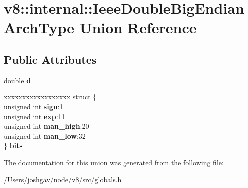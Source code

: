 \hypertarget{unionv8_1_1internal_1_1_ieee_double_big_endian_arch_type}{}\section{v8\+:\+:internal\+:\+:Ieee\+Double\+Big\+Endian\+Arch\+Type Union Reference}
\label{unionv8_1_1internal_1_1_ieee_double_big_endian_arch_type}
\subsection*{Public Attributes}
\begin{DoxyCompactItemize}
\item 
double {\bfseries d}\hypertarget{unionv8_1_1internal_1_1_ieee_double_big_endian_arch_type_a08d5c0c44b46ddb10508790724f0f6a3}{}\label{unionv8_1_1internal_1_1_ieee_double_big_endian_arch_type_a08d5c0c44b46ddb10508790724f0f6a3}

\item 
\begin{tabbing}
xx\=xx\=xx\=xx\=xx\=xx\=xx\=xx\=xx\=\kill
struct \{\\
\>unsigned int {\bfseries sign}:1\\
\>unsigned int {\bfseries exp}:11\\
\>unsigned int {\bfseries man\_high}:20\\
\>unsigned int {\bfseries man\_low}:32\\
\} {\bfseries bits}\hypertarget{unionv8_1_1internal_1_1_ieee_double_big_endian_arch_type_ab55ac3feac16493dfc5b4dfd039395c0}{}\label{unionv8_1_1internal_1_1_ieee_double_big_endian_arch_type_ab55ac3feac16493dfc5b4dfd039395c0}
\\

\end{tabbing}\end{DoxyCompactItemize}


The documentation for this union was generated from the following file\+:\begin{DoxyCompactItemize}
\item 
/\+Users/joshgav/node/v8/src/globals.\+h\end{DoxyCompactItemize}

